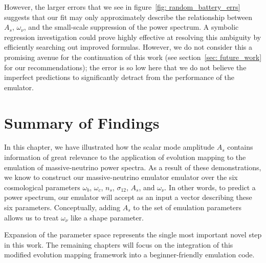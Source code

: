 However, the larger errors that we see in
figure~\ref{fig: random_battery_errs} suggests that our fit may only
approximately describe the relationship
between $A_s$, $\omega_\nu$, and the small-scale suppression of the power
spectrum. A symbolic regression investigation could prove highly effective at
resolving this ambiguity by efficiently searching out improved formulas. 
However, we do not consider this a promising avenue
for the continuation of this work (see section~\ref{sec: future_work} for our
recommendations); the error
is so low here that we do not believe the imperfect predictions to
significantly detract from the performance of the emulator.

\section{Summary of Findings}


In this chapter, we have illustrated how the scalar mode amplitude $A_s$
contains information of great relevance to the application of evolution
mapping to the emulation of massive-neutrino power spectra. As a result of 
these demonstrations, we know to construct 
our massive-neutrino emulator emulator over the six cosmological
parameters $\omega_b$, $\omega_c$, $n_s$, $\sigma_{12}$, $A_s$, and
$\omega_\nu$. In other words, to predict a power
spectrum, our emulator will accept as an input a vector describing
these six parameters. Conceptually, adding $A_s$ to the set of
emulation parameters allows us to treat $\omega_\nu$ like a shape
parameter.

Expansion of the parameter space represents the single most 
important novel step in this work. The remaining chapters will
focus on the integration of this modified evolution mapping framework
into a beginner-friendly emulation code.
